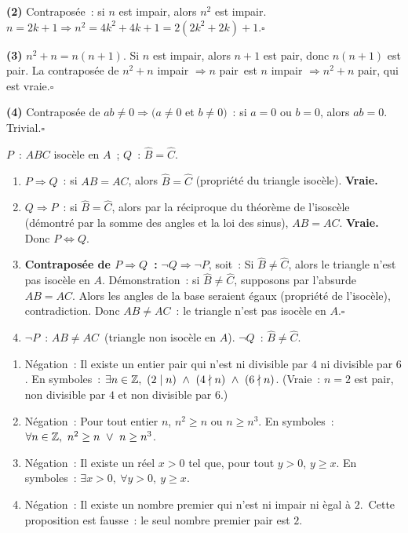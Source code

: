 \textbf{(2)} Contrapos\'ee~: si $n$ est impair, alors $n^2$ est impair.
$n=2k+1\Rightarrow n^2=4k^2+4k+1=2(2k^2+2k)+1$.\hfill$\square$

\textbf{(3)} $n^2+n=n(n+1)$. Si $n$ est impair, alors $n+1$ est pair, donc $n(n+1)$ est pair.
La contrapos\'ee de \og$n^2+n$ impair $\Rightarrow n$ pair\fg\ est \og$n$ impair $\Rightarrow n^2+n$ pair\fg, qui est vraie.\hfill$\square$

\textbf{(4)} Contrapos\'ee de $ab\ne0\Rightarrow(a\ne0$ et $b\ne0)$~:
si $a=0$ ou $b=0$, alors $ab=0$. Trivial.\hfill$\square$


$P$~: \og$ABC$ isoc\`ele en $A$\fg~; $Q$~: \og$\hat B=\hat C$\fg.

\begin{enumerate}
  \item $P\Rightarrow Q$~: si $AB=AC$, alors $\hat B=\hat C$ (propri\'et\'e du triangle isoc\`ele).
        \textbf{Vraie.}
  \item $Q\Rightarrow P$~: si $\hat B=\hat C$, alors par la r\'eciproque du th\'eor\`eme
        de l'isosc\`ele (d\'emontr\'e par la somme des angles et la loi des sinus),
        $AB=AC$. \textbf{Vraie.}
        Donc $P\Leftrightarrow Q$.
  \item \textbf{Contrapos\'ee de $P\Rightarrow Q$~:}
        $\lnot Q\Rightarrow\lnot P$, soit~:
        \og Si $\hat B\ne\hat C$, alors le triangle n'est pas isoc\`ele en $A$\fg.
        D\'emonstration~: si $\hat B\ne\hat C$, supposons par l'absurde $AB=AC$.
        Alors les angles de la base seraient \'egaux (propri\'et\'e de l'isoc\`ele),
        contradiction. Donc $AB\ne AC$~: le triangle n'est pas isoc\`ele en $A$.\hfill$\square$
  \item $\lnot P$~: \og $AB\ne AC$\fg\ (triangle non isoc\`ele en $A$).
        $\lnot Q$~: \og $\hat B\ne\hat C$\fg.
\end{enumerate}


\begin{enumerate}
  \item N\'egation~: \og Il existe un entier pair qui n'est ni divisible par $4$
        ni divisible par $6$.\fg
        En symboles~: $\exists n\in\Z,\ (2\mid n)\ \land\ (4\nmid n)\ \land\ (6\nmid n)$.
        (Vraie~: $n=2$ est pair, non divisible par $4$ et non divisible par $6$.)
  \item N\'egation~: \og Pour tout entier $n$, $n^2\geq n$ ou $n\geq n^3$.\fg
        En symboles~: $\forall n\in\Z,\ n^2\geq n\ \lor\ n\geq n^3$.
  \item N\'egation~: \og Il existe un r\'eel $x>0$ tel que, pour tout $y>0$, $y\geq x$.\fg
        En symboles~: $\exists x>0,\ \forall y>0,\ y\geq x$.
  \item N\'egation~: \og Il existe un nombre premier qui n'est ni impair ni
        \`egal \`a $2$.\fg\ Cette proposition est fausse~: le seul nombre premier
        pair est $2$.
\end{enumerate}

